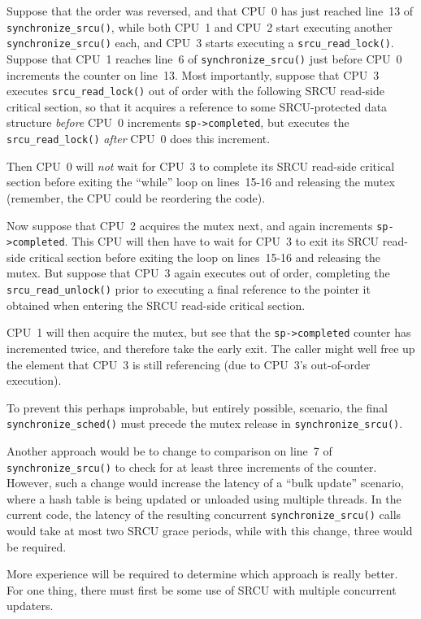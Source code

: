 	Suppose that the order was reversed, and that CPU~0
	has just reached line~13 of
	{\tt synchronize\_srcu()}, while both CPU~1 and CPU~2 start executing
	another {\tt synchronize\_srcu()} each, and CPU~3 starts executing a
	{\tt srcu\_read\_lock()}.
	Suppose that CPU~1 reaches line~6 of {\tt synchronize\_srcu()}
	just before CPU~0 increments the counter on line~13.
	Most importantly, suppose that
	CPU~3 executes {\tt srcu\_read\_lock()}
	out of order with the following SRCU read-side critical section,
	so that it acquires a reference to some SRCU-protected data
	structure \emph{before} CPU~0 increments {\tt sp->completed}, but
	executes the {\tt srcu\_read\_lock()} \emph{after} CPU~0 does
	this increment.
	
	Then CPU~0 will \emph{not} wait for CPU~3 to complete its
	SRCU read-side critical section before exiting the ``while''
	loop on lines~15-16 and releasing the mutex (remember, the
	CPU could be reordering the code).
	
	Now suppose that CPU~2 acquires the mutex next,
	and again increments {\tt sp->completed}.
	This CPU will then have to wait for CPU~3 to exit its SRCU
	read-side critical section before exiting the loop on
	lines~15-16 and releasing the mutex.
	But suppose that CPU~3 again executes out of order,
	completing the {\tt srcu\_read\_unlock()} prior to
	executing a final reference to the pointer it obtained
	when entering the SRCU read-side critical section.

	CPU~1 will then acquire the mutex, but see that the
	{\tt sp->completed} counter has incremented twice, and
	therefore take the early exit.
	The caller might well free up the element that CPU~3 is
	still referencing (due to CPU~3's out-of-order execution).

	To prevent this perhaps improbable, but entirely possible,
	scenario, the final {\tt synchronize\_sched()} must precede
	the mutex release in {\tt synchronize\_srcu()}.

	Another approach would be to change to comparison on
	line~7 of {\tt synchronize\_srcu()} to check for at
	least three increments of the counter.
	However, such a change would increase the latency of a
	``bulk update'' scenario, where a hash table is being updated
	or unloaded using multiple threads.
	In the current code, the latency of the resulting concurrent
	{\tt synchronize\_srcu()} calls would take at most two SRCU
	grace periods, while with this change, three would be required.

	More experience will be required to determine which approach
	is really better.
	For one thing, there must first be some use of SRCU with
	multiple concurrent updaters.


